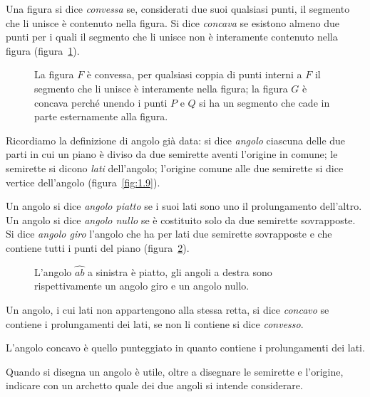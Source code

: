 \begin{definizione}
Una figura si dice \emph{convessa} se, considerati due suoi qualsiasi punti, il segmento che li unisce è contenuto nella figura. Si dice \emph{concava} se esistono almeno due punti per i quali il segmento che li unisce non è interamente contenuto nella figura (figura~\ref{fig:1.18}).
\end{definizione}
\begin{figure}[b,t,h]
 \centering 
 \caption{La figura $ F $ è convessa, per qualsiasi coppia di punti interni a $ F $ il segmento che li unisce è interamente nella figura; la figura $ G $ è concava perché unendo i punti $ P $ e $ Q $ si ha un segmento che cade in parte esternamente alla figura.}\label{fig:1.18}
\end{figure}

Ricordiamo la definizione di angolo già data: si dice \emph{angolo} ciascuna delle due parti in cui un piano è diviso da due semirette aventi l'origine in comune; le semirette si dicono \emph{lati} dell'angolo; l'origine comune alle due semirette si dice vertice dell'angolo (figura~\ref{fig:1.9}).

\begin{definizione}
Un angolo si dice \emph{angolo piatto} se i suoi lati sono uno il prolungamento dell'altro.
Un angolo si dice \emph{angolo nullo} se è costituito solo da due semirette sovrapposte.
Si dice \emph{angolo giro} l'angolo che ha per lati due semirette sovrapposte e che contiene tutti i punti del piano (figura~\ref{fig:1.19}).
\end{definizione}
\begin{figure}[b,t,h]
 \centering 
 \caption{L'angolo  $\widehat{ab}$ a sinistra è piatto, gli angoli a destra sono rispettivamente un angolo giro e un angolo nullo.}\label{fig:1.19}
\end{figure}

\begin{definizione}
Un angolo, i cui lati non appartengono alla stessa retta, si dice \emph{concavo} se contiene i prolungamenti dei lati, se non li contiene si dice \emph{convesso}.
\end{definizione}

L'angolo concavo è quello punteggiato in quanto contiene i prolungamenti dei lati.

Quando si disegna un angolo è utile, oltre a disegnare le semirette e l'origine, indicare con un archetto quale dei due angoli si intende considerare.

